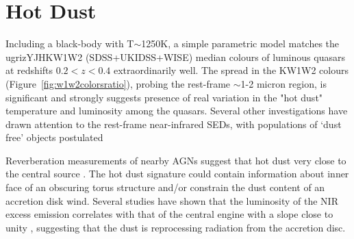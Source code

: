 

\section{Hot Dust}

Including a black-body with T$\sim$1250K, a simple parametric model matches the ugrizYJHKW1W2 (SDSS+UKIDSS+WISE) median colours of luminous quasars at redshifts $0.2 < z < 0.4$ extraordinarily well.
The spread in the KW1W2 colours (Figure~\ref{fig:w1w2colorsratio}), probing the rest-frame $\sim$1-2 micron region, is significant and strongly suggests presence of real variation in the "hot dust" temperature and luminosity among the quasars. 
Several other investigations have drawn attention to the rest-frame near-infrared SEDs, with populations of `dust free' objects postulated \citep{hao10,hao11,jiang10,mor11} 

Reverberation measurements of nearby AGNs suggest that hot dust very close to the central source \citep[few tens of light days; e.g.][]{minezaki04,suganuma06}. 
The hot dust signature could contain information about inner face of an obscuring torus structure and/or constrain the dust content of an accretion disk wind. 
Several studies have shown that the luminosity of the NIR excess emission correlates with that of the central engine with a slope close to unity \cite[e.g.][]{gallagher07}, suggesting that the dust is reprocessing radiation from the accretion disc. 


